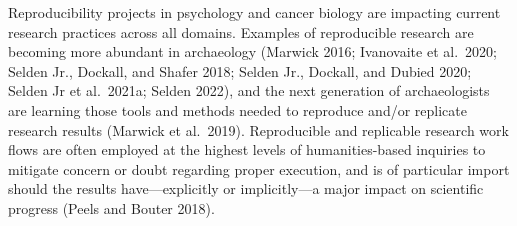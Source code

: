 \documentclass[]{interact}
\theoremstyle{plain}%
\theoremstyle{definition}
\theoremstyle{remark}
\begin{document}
Reproducibility projects in psychology and cancer biology are impacting
current research practices across all domains. Examples of reproducible
research are becoming more abundant in archaeology (Marwick 2016;
Ivanovaite et al.~2020; Selden Jr., Dockall, and Shafer 2018; Selden
Jr., Dockall, and Dubied 2020; Selden Jr et al.~2021a; Selden 2022), and
the next generation of archaeologists are learning those tools and
methods needed to reproduce and/or replicate research results (Marwick
et al.~2019). Reproducible and replicable research work flows are often
employed at the highest levels of humanities-based inquiries to mitigate
concern or doubt regarding proper execution, and is of particular import
should the results have---explicitly or implicitly---a major impact on
scientific progress (Peels and Bouter 2018).






\end{document}
